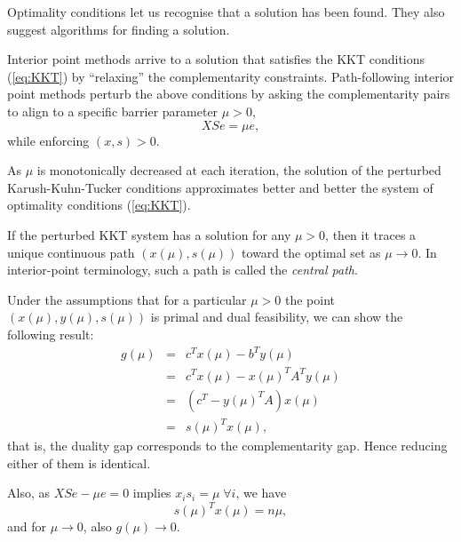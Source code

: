 Optimality conditions let us recognise that a solution has been
found. They also suggest algorithms for finding a solution.


Interior point methods arrive to a solution that satisfies the KKT
conditions (\ref{eq:KKT}) by ``relaxing'' the complementarity constraints.
%
Path-following interior point methods \cite{ipm:Wright97} perturb 
the above conditions by asking the complementarity pairs to align 
to a specific barrier parameter $\mu > 0$,
\[
XSe = \mu e,
\]
while enforcing $(x,s)>0$.


As $\mu$ is monotonically decreased at each iteration, the solution of the 
perturbed Karush-Kuhn-Tucker conditions approximates better and better
the system of optimality conditions (\ref{eq:KKT}).

If the perturbed KKT system has a solution for any $\mu > 0$, then
it traces a unique continuous path $(x(\mu),s(\mu))$ toward the 
optimal set as $\mu \to 0$. 
In interior-point terminology, such a path is called
the {\em central path}.

Under the assumptions that for a particular $\mu > 0$ the point
$(x(\mu),y(\mu),s(\mu))$ is primal and dual feasibility, we can show
the following result:
\begin{eqnarray*}
  g(\mu) & = & c^Tx(\mu) - b^T y(\mu) \\
         & = & c^Tx(\mu) - x(\mu)^T A^T y(\mu) \\
         & = & ( c^T - y(\mu)^T A) x(\mu) \\
	 & = & s(\mu)^T x(\mu),
\end{eqnarray*}
that is, the duality gap corresponds to the complementarity gap.
Hence reducing either of them is identical.

Also, as $XSe - \mu e = 0$ implies $x_is_i = \mu \; \forall i$, we have
\[
   s(\mu)^T x(\mu) = n\mu,
\]
and for $\mu \to 0$, also $g(\mu) \to 0$.

